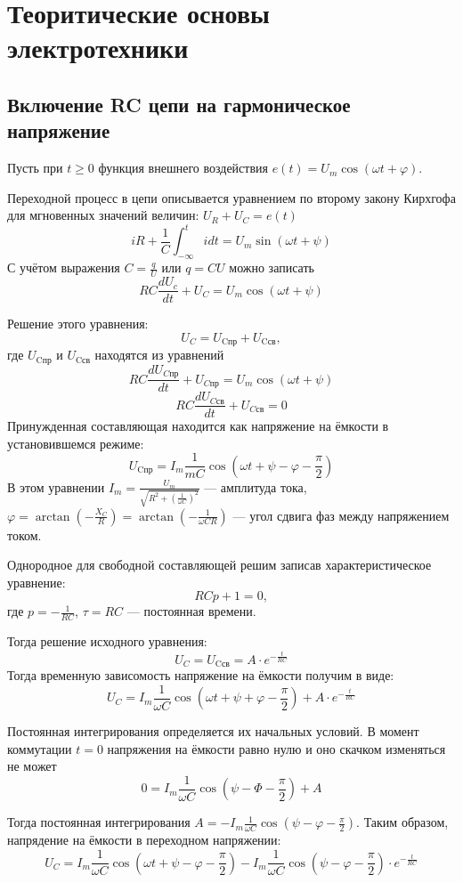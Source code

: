 \part{Теоритические основы электротехники}

\chapter{Включение RC цепи на гармоническое напряжение}

Пусть при $t \geq 0$ функция внешнего воздействия $e(t) = U_m
\cos(\omega t + \varphi)$.

Переходной процесс в цепи описывается уравнением по второму закону
Кирхгофа для мгновенных значений величин: $U_R + U_C = e(t)$
$$iR + \frac{1}{C} \int_{-\infty}^t i dt = U_m \sin(\omega t + \psi)$$
С учётом выражения $C = \frac{q}{U}$ или $q = CU$ можно записать
$$RC \frac{dU_c}{dt} + U_C = U_m \cos(\omega t + \psi)$$

Решение этого уравнения:
\[ U_C = U_\text{Cпр} + U_\text{Cсв}, \]
где $U_\text{Cпр}$ и $U_\text{Cсв}$ находятся из уравнений
\[ RC \frac{dU_{Cпр}}{dt} + U_{Cпр} = U_m \cos(\omega t + \psi) \]
\[ RC \frac{d U_{Cсв}}{dt} + U_{Cсв} = 0 \]
Принужденная составляющая находится как напряжение на ёмкости в
установившемся режиме:
\[ U_\text{Cпр} = I_m \frac{1}{mC} \cos(\omega t + \psi - \varphi -
\frac{\pi}{2}) \]
В этом уравнении $I_m = \frac{U_m}{\sqrt{R^2 + \left(\frac{1}{\omega
C}\right)^2}}$ — амплитуда тока, $\varphi = \arctan \left(-\frac{X_C}{R}\right)
= \arctan\left(-\frac{1}{\omega CR}\right)$ --- угол  сдвига фаз  между
напряжением током.

Однородное для свободной составляющей решим записав
характеристическое уравнение:
\[ R Cp + 1 = 0, \]
где $p = -\frac{1}{RC}$, $\tau = RC$ — постоянная времени.

Тогда решение исходного уравнения:
\[ U_C = U_\text{Cсв} = A \cdot e^{-\frac{t}{RC}} \]
Тогда временную зависомость напряжение на ёмкости получим в виде:
\[ U_C = I_m \frac{1}{\omega C} \cos(\omega t + \psi + \varphi -
\frac{\pi}{2}) + A \cdot e^{-\frac{t}{RC}} \]

Постоянная интегрирования определяется их начальных  условий. В
момент коммутации $t = 0$ напряжения на ёмкости  равно нулю и оно
скачком изменяться не может
\[ 0 = I_m \frac{1}{\omega C} \cos(\psi - \varPhi - \frac{\pi}{2}) + A \]

Тогда постоянная интегрирования $A = -I_m \frac{1}{\omega C}
\cos(\psi - \varphi - \frac{\pi}{2})$. Таким образом, напрядение на
ёмкости в переходном напряжении:
\[ U_C = I_m \frac{1}{\omega C} \cos(\omega t + \psi - \varphi -
  \frac{\pi}{2}) - I_m \frac{1}{\omega C} \cos(\psi - \varphi -
\frac{\pi}{2}) \cdot e^{-\frac{t}{RC}} \]

